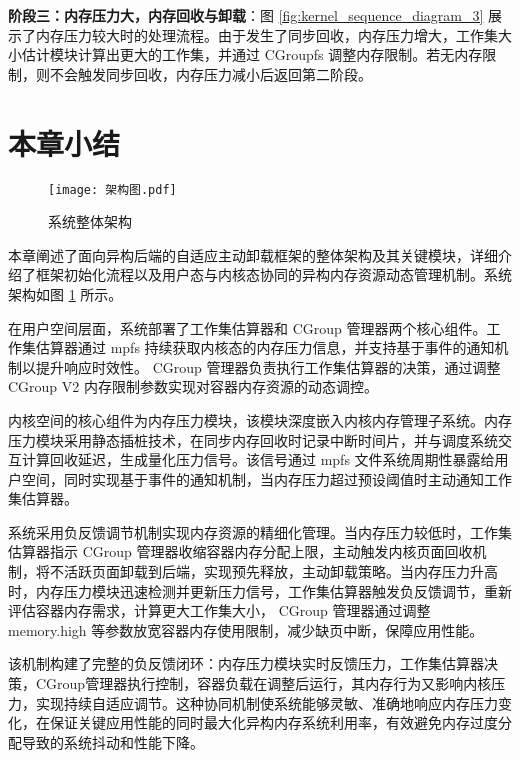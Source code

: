\textbf{阶段三：内存压力大，内存回收与卸载}：图 \ref{fig:kernel_sequence_diagram_3} 展示了内存压力较大时的处理流程。由于发生了同步回收，内存压力增大，工作集大小估计模块计算出更大的工作集，并通过  CGroupfs  调整内存限制。若无内存限制，则不会触发同步回收，内存压力减小后返回第二阶段。

\section{本章小结}

\begin{figure}[htb]
    \centering
    \texttt{[image: 架构图.pdf]}
    \caption{系统整体架构}
    \label{fig:system_architecture}
\end{figure}

本章阐述了面向异构后端的自适应主动卸载框架的整体架构及其关键模块，详细介绍了框架初始化流程以及用户态与内核态协同的异构内存资源动态管理机制。系统架构如图 \ref{fig:system_architecture} 所示。

在用户空间层面，系统部署了工作集估算器和 CGroup 管理器两个核心组件。工作集估算器通过 mpfs 持续获取内核态的内存压力信息，并支持基于事件的通知机制以提升响应时效性。 CGroup 管理器负责执行工作集估算器的决策，通过调整 CGroup V2 内存限制参数实现对容器内存资源的动态调控。

内核空间的核心组件为内存压力模块，该模块深度嵌入内核内存管理子系统。内存压力模块采用静态插桩技术，在同步内存回收时记录中断时间片，并与调度系统交互计算回收延迟，生成量化压力信号。该信号通过 mpfs 文件系统周期性暴露给用户空间，同时实现基于事件的通知机制，当内存压力超过预设阈值时主动通知工作集估算器。

系统采用负反馈调节机制实现内存资源的精细化管理。当内存压力较低时，工作集估算器指示 CGroup 管理器收缩容器内存分配上限，主动触发内核页面回收机制，将不活跃页面卸载到后端，实现预先释放，主动卸载策略。当内存压力升高时，内存压力模块迅速检测并更新压力信号，工作集估算器触发负反馈调节，重新评估容器内存需求，计算更大工作集大小， CGroup  管理器通过调整 memory.high 等参数放宽容器内存使用限制，减少缺页中断，保障应用性能。

该机制构建了完整的负反馈闭环：内存压力模块实时反馈压力，工作集估算器决策，CGroup管理器执行控制，容器负载在调整后运行，其内存行为又影响内核压力，实现持续自适应调节。这种协同机制使系统能够灵敏、准确地响应内存压力变化，在保证关键应用性能的同时最大化异构内存系统利用率，有效避免内存过度分配导致的系统抖动和性能下降。
